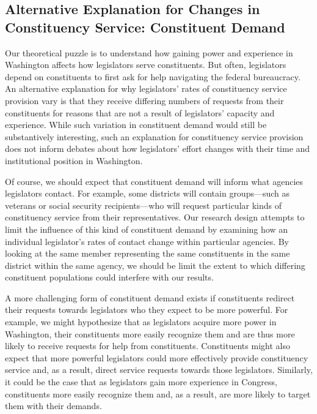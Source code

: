 \documentclass[12pt]{article}
\begin{document}
\subsection{Alternative Explanation for Changes in Constituency Service: Constituent Demand}

Our theoretical puzzle is to understand how gaining power and experience in Washington affects how legislators serve constituents. But often, legislators depend on constituents to first ask for help navigating the federal bureaucracy. An alternative explanation for why legislators' rates of constituency service provision vary is that they receive differing numbers of requests from their constituents for reasons that are not a result of legislators' capacity and experience. While such variation in constituent demand would still be substantively interesting, such an explanation for constituency service provision does not inform debates about how legislators' effort changes with their time and institutional position in Washington. 

Of course, we should expect that constituent demand will inform what agencies legislators contact. For example, some districts will contain groups---such as veterans or social security recipients---who will request particular kinds of constituency service from their representatives. Our research design attempts to limit the influence of this kind of constituent demand by examining how an individual legislator's rates of contact change within particular agencies. By looking at the same member representing the same constituents in the same district within the same agency, we should be limit the extent to which differing constituent populations could interfere with our results. 

A more challenging form of constituent demand exists if constituents redirect their requests towards legislators who they expect to be more powerful. For example, we might hypothesize that as legislators acquire more power in Washington, their constituents more easily recognize them and are thus more likely to receive requests for help from constituents. Constituents might also expect that more powerful legislators could more effectively provide constituency service and, as a result, direct service requests towards those legislators. Similarly, it could be the case that as legislators gain more experience in Congress, constituents more easily recognize them and, as a result, are more likely to target them with their demands. 
\end{document}
